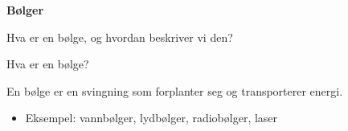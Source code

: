 \documentclass[aspectratio=119,12pt]{beamer}
\begin{document}
\begin{frame}
    \centering
    \Huge \textbf{Bølger}

    \vspace{1cm}

    \Large
    Hva er en bølge, og hvordan beskriver vi den?
\end{frame}

\begin{frame}{Hva er en bølge?}

    \begin{center}
        \Large
        En bølge er en svingning som forplanter seg
        og transporterer energi.
    \end{center}

    \vspace{1cm}
    \begin{itemize}
        \item Eksempel: vannbølger, lydbølger, radiobølger, laser
    \end{itemize}
    \vspace{1cm}





\end{frame}
\end{document}
